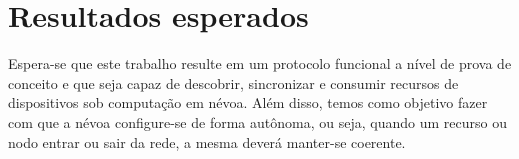 





\section{Resultados esperados}

Espera-se que este trabalho resulte em um protocolo funcional a nível de prova de conceito e que seja capaz de descobrir, sincronizar e consumir recursos de dispositivos sob computação em névoa.
Além disso, temos como objetivo fazer com que a névoa configure-se de forma autônoma, ou seja, quando um recurso ou nodo entrar ou sair da rede, a mesma deverá manter-se coerente.


